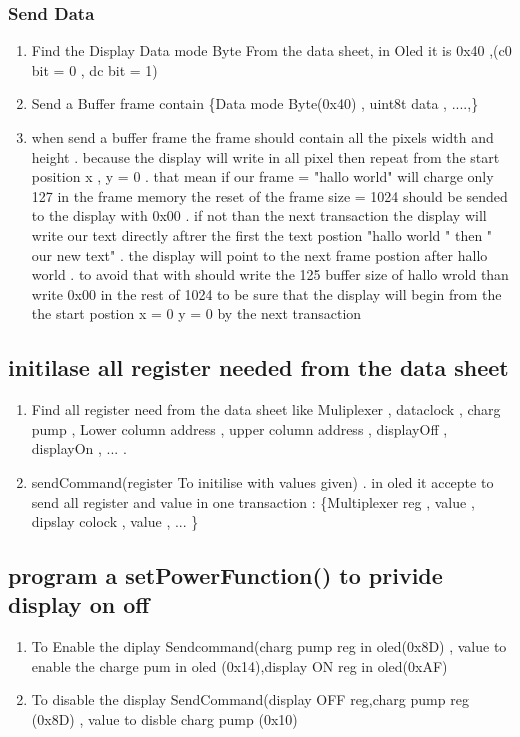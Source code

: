 \documentclass[11pt]{article}
\begin{document}
\subsubsection{Send Data}
\begin{enumerate}
\item Find the Display Data mode Byte From the data sheet, in Oled it is 0x40 ,(c0 bit = 0 , dc bit = 1) 

\item Send a Buffer frame contain \{Data mode Byte(0x40) , uint8t data , ....,\} 

\item when send a buffer frame the frame should contain all the pixels width and height . because the display will write in all pixel then repeat from the start position x , y = 0 . that mean if our frame = "hallo world"  will charge only 127 in the frame memory the reset of the frame size = 1024 should be sended to the display with 0x00 . if not than the next transaction the display will write our text directly  aftrer the first the text postion "hallo world " then " our new text" . the display will point to the next frame postion after hallo world . to avoid that with should write the 125 buffer size of hallo wrold than write 0x00 in the rest of 1024 to be sure that the display will begin from the the start postion x = 0 y = 0 by the next transaction
\end{enumerate}

\vspace{4cm}
\subsection{initilase all register needed from the data sheet}
\begin{enumerate}
\item Find all register need from the data sheet like Muliplexer , dataclock , charg pump , Lower column address , upper column address , displayOff , displayOn , ... .

\item sendCommand(register To initilise with values given) . in oled it accepte to send all register and value in one transaction : \{Multiplexer reg , value , dipslay colock , value , ... \}
 
\end{enumerate}
\vspace{4cm}
\subsection{program a setPowerFunction() to privide display on off}
\begin{enumerate}
\item To Enable the diplay Sendcommand(charg pump reg in oled(0x8D) , value to enable the charge pum in oled (0x14),display ON reg in oled(0xAF)

\item To disable the display SendCommand(display OFF reg,charg pump reg (0x8D) , value to disble charg pump (0x10) 
\end{enumerate}
\end{document}
